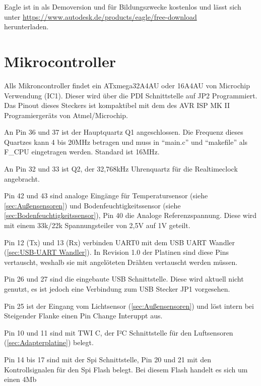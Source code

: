 \documentclass[12pt, a4paper, oneside]{report}
\begin{document}
Eagle ist in als Demoversion und für Bildungszwecke kostenlos und lässt sich unter \url{https://www.autodesk.de/products/eagle/free-download}\\ herunterladen.
\section{Mikrocontroller}
\label{sec:Mikrocontroller}
Alls Mikroncontroller findet ein ATxmega32A4AU\cite{ds:xmega} oder 16A4AU von Microchip Verwendung (IC1). Dieser wird über die PDI Schnittstelle auf JP2 Programmiert. Das Pinout dieses Steckers ist kompaktibel mit dem des AVR ISP MK II Programiergeräts von Atmel/Microchip.

An Pin 36 und 37 ist der Hauptquartz Q1 angeschlossen. Die Frequenz dieses Quartzes kann 4 bis 20MHz betragen und muss in "`main.c"' und "`makefile"' als F\_CPU eingetragen werden. Standard ist 16MHz.

An Pin 32 und 33 ist Q2, der 32,768kHz Uhrenquartz für die Realtimeclock angebracht.

Pin 42 und 43 sind analoge Eingänge für Temperatursensor (siehe \autoref{sec:Außensensoren}) und Bodenfeuchtigkeitssensor (siehe \autoref{sec:Bodenfeuchtigkeitssensor}), Pin 40 die Analoge Referenzspannung. Diese wird mit einem 33k/22k Spannungsteiler von 2,5V auf 1V geteilt.

Pin 12 (Tx) und 13 (Rx) verbinden UART0 mit dem USB UART Wandler (\autoref{sec:USB-UART Wandler}). In Revision 1.0 der Platinen sind diese Pins vertauscht, weshalb sie mit angelöteten Drähten vertauscht werden müssen.

Pin 26 und 27 sind die eingebaute USB Schnittstelle. Diese wird aktuell nicht genutzt, es ist jedoch eine Verbindung zum USB Stecker JP1 vorgesehen.

Pin 25 ist der Eingang vom Lichtsensor (\autoref{sec:Außensensoren}) und löst intern bei Steigender Flanke einen Pin Change Interuppt aus.

Pin 10 und 11 sind mit TWI C, der I²C Schnittstelle für den Luftsensoren (\autoref{sec:Adapterplatine}) belegt.

Pin 14 bis 17 sind mit der Spi Schnittstelle, Pin 20 und 21 mit den Kontrollsignalen für den Spi Flash belegt.
Bei diesem Flash handelt es sich um einen 4Mb 
\end{document}
